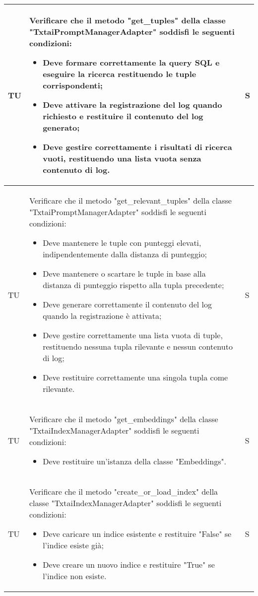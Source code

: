 \begin{adjustwidth}{-0.5cm}{-0.5cm}
\begin{longtable}{|P{1.5cm}|>{\raggedright}P{9.5cm}|>{\arraybackslash}P{1.5cm}|}
		\hline TU & Verificare che il metodo "get\_tuples" della classe "TxtaiPromptManagerAdapter" soddisfi le seguenti condizioni:
		\begin{itemize}
			\item Deve formare correttamente la query SQL e eseguire la ricerca restituendo le tuple corrispondenti;
			\item Deve attivare la registrazione del log quando richiesto e restituire il contenuto del log generato;
			\item Deve gestire correttamente i risultati di ricerca vuoti, restituendo una lista vuota senza contenuto di log.
		\end{itemize} & S \\

		\hline TU & Verificare che il metodo "get\_relevant\_tuples" della classe "TxtaiPromptManagerAdapter" soddisfi le seguenti condizioni:
		\begin{itemize}
			\item Deve mantenere le tuple con punteggi elevati, indipendentemente dalla distanza di punteggio;
			\item Deve mantenere o scartare le tuple in base alla distanza di punteggio rispetto alla tupla precedente;
			\item Deve generare correttamente il contenuto del log quando la registrazione è attivata;
			\item Deve gestire correttamente una lista vuota di tuple, restituendo nessuna tupla rilevante e nessun contenuto di log;
			\item Deve restituire correttamente una singola tupla come rilevante.
		\end{itemize} & S \\

		\hline TU & Verificare che il metodo "get\_embeddings" della classe "TxtaiIndexManagerAdapter" soddisfi le seguenti condizioni:
		\begin{itemize}
			\item Deve restituire un'istanza della classe "Embeddings".
		\end{itemize} & S \\

		\hline TU & Verificare che il metodo "create\_or\_load\_index" della classe "TxtaiIndexManagerAdapter" soddisfi le seguenti condizioni:
		\begin{itemize}
			\item Deve caricare un indice esistente e restituire "False" se l'indice esiste già;
			\item Deve creare un nuovo indice e restituire "True" se l'indice non esiste.
		\end{itemize} & S \\


\end{longtable}
\end{adjustwidth}
